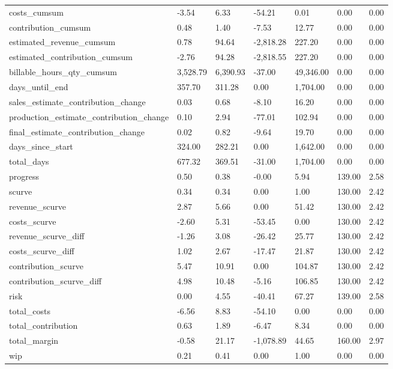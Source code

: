 \begin{landscape}
\begin{longtable}{lllllll}
costs\_cumsum & -3.54 & 6.33 & -54.21 & 0.01 & 0.00 & 0.00 \\
contribution\_cumsum & 0.48 & 1.40 & -7.53 & 12.77 & 0.00 & 0.00 \\
estimated\_revenue\_cumsum & 0.78 & 94.64 & -2,818.28 & 227.20 & 0.00 & 0.00 \\
estimated\_contribution\_cumsum & -2.76 & 94.28 & -2,818.55 & 227.20 & 0.00 & 0.00 \\
billable\_hours\_qty\_cumsum & 3,528.79 & 6,390.93 & -37.00 & 49,346.00 & 0.00 & 0.00 \\
days\_until\_end & 357.70 & 311.28 & 0.00 & 1,704.00 & 0.00 & 0.00 \\
sales\_estimate\_contribution\_change & 0.03 & 0.68 & -8.10 & 16.20 & 0.00 & 0.00 \\
production\_estimate\_contribution\_change & 0.10 & 2.94 & -77.01 & 102.94 & 0.00 & 0.00 \\
final\_estimate\_contribution\_change & 0.02 & 0.82 & -9.64 & 19.70 & 0.00 & 0.00 \\
days\_since\_start & 324.00 & 282.21 & 0.00 & 1,642.00 & 0.00 & 0.00 \\
total\_days & 677.32 & 369.51 & -31.00 & 1,704.00 & 0.00 & 0.00 \\
progress & 0.50 & 0.38 & -0.00 & 5.94 & 139.00 & 2.58 \\
scurve & 0.34 & 0.34 & 0.00 & 1.00 & 130.00 & 2.42 \\
revenue\_scurve & 2.87 & 5.66 & 0.00 & 51.42 & 130.00 & 2.42 \\
costs\_scurve & -2.60 & 5.31 & -53.45 & 0.00 & 130.00 & 2.42 \\
revenue\_scurve\_diff & -1.26 & 3.08 & -26.42 & 25.77 & 130.00 & 2.42 \\
costs\_scurve\_diff & 1.02 & 2.67 & -17.47 & 21.87 & 130.00 & 2.42 \\
contribution\_scurve & 5.47 & 10.91 & 0.00 & 104.87 & 130.00 & 2.42 \\
contribution\_scurve\_diff & 4.98 & 10.48 & -5.16 & 106.85 & 130.00 & 2.42 \\
risk & 0.00 & 4.55 & -40.41 & 67.27 & 139.00 & 2.58 \\
total\_costs & -6.56 & 8.83 & -54.10 & 0.00 & 0.00 & 0.00 \\
total\_contribution & 0.63 & 1.89 & -6.47 & 8.34 & 0.00 & 0.00 \\
total\_margin & -0.58 & 21.17 & -1,078.89 & 44.65 & 160.00 & 2.97 \\
wip & 0.21 & 0.41 & 0.00 & 1.00 & 0.00 & 0.00 \\

\end{longtable}
\end{landscape}
